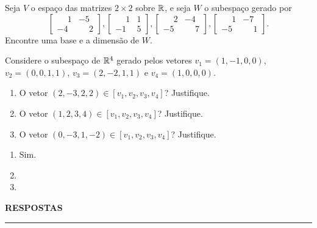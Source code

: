 \documentclass[12pt]{exam}
\begin{document}
\begin{exercicio}
	Seja $V$ o espa\c{c}o das matrizes $2 \times 2$ sobre $\mathbb{R}$, e seja $W$ o subespa\c{c}o gerado por
	\[
	\begin{bmatrix}
		\phantom{-} 1 & -5\\
		-4 & \phantom{-} 2
	\end{bmatrix},
	\begin{bmatrix}
		\phantom{-} 1 & 1\\
		-1 & 5
	\end{bmatrix},
	\begin{bmatrix}
		\phantom{-} 2 & -4\\
		-5 & \phantom{-} 7
	\end{bmatrix},
	\begin{bmatrix}
		\phantom{-} 1 & -7\\
		-5 & \phantom{-} 1
	\end{bmatrix}.
	\]
	Encontre uma base e a dimens\~ao de $W$.
\end{exercicio}

\begin{exercicio}
	Considere o subespa\c{c}o de $\mathbb{R}^4$ gerado pelos vetores $v_1 = (1, -1, 0, 0)$, $v_2 = (0, 0, 1, 1)$, $v_3 = (2, -2, 1, 1)$ e $v_4 = (1, 0, 0, 0)$.
	\begin{enumerate}[label={\alph*})]
		\item O vetor $(2, -3, 2, 2) \in [v_1, v_2, v_3, v_4]$? Justifique.

        \item O vetor $(1, 2, 3, 4) \in [v_1, v_2, v_3, v_4]$? Justifique.

        \item O vetor $(0, -3, 1, -2) \in [v_1, v_2, v_3, v_4]$? Justifique.
	\end{enumerate}
	\begin{solucao}
		\begin{enumerate}[label={\alph*})]
			\item Sim.
			\item
			\item
		\end{enumerate}
	\end{solucao}
\end{exercicio}

\newpage
{}

\begin{center}
{\large\bf RESPOSTAS}
\end{center}
\hrule

\end{document}
